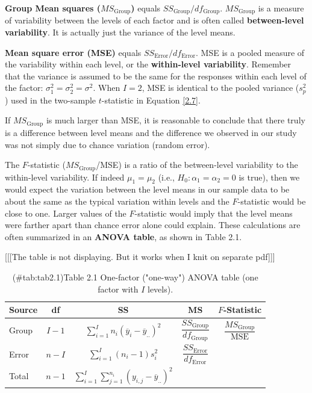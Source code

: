 \documentclass[
]{report}
\begin{document}
\textbf{Group Mean squares (\(MS_{\text{Group}}\))} equals \(SS_{\text{Group}}/df_{\text{Group}}\). \(MS_{\text{Group}}\) is a measure of variability between the levels of each factor and is often called \textbf{between-level variability}. It is actually just the variance of the level means.

\textbf{Mean square error (MSE)} equals \(SS_{\text{Error}}/df_{\text{Error}}\). MSE is a pooled measure of the variability within each level, or the \textbf{within-level variability}. Remember that the variance is assumed to be the same for the responses within each level of the factor: \(\sigma_1^2 = \sigma_2^2 = \sigma^2\). When \(I = 2\), MSE is identical to the pooled variance (\(s_p^2\)) used in the two-sample \(t\)-statistic in Equation \ref{2.7}.

If \(MS_{\text{Group}}\) is much larger than MSE, it is reasonable to conclude that there truly is a difference between level means and the difference we observed in our study was not simply due to chance variation (random error).

The \(F\)-statistic (\(MS_{\text{Group}}\)/MSE) is a ratio of the between-level variability to the within-level variability. If indeed \(\mu_1 = \mu_2\) (i.e., \(H_0\!:\! \alpha_1 = \alpha_2 = 0\) is true), then we would expect the variation between the level means in our sample data to be about the same as the typical variation within levels and the \(F\)-statistic would be close to one. Larger values of the \(F\)-statistic would imply that the level means were farther apart than chance error alone could explain. These calculations are often summarized in an \textbf{ANOVA table}, as shown in Table 2.1.

{[}{[}{[}The table is not displaying. But it works when I knit on separate pdf{]}{]}{]}

\begin{table}[!h]
\centering
\caption{(\#tab:tab2.1)Table 2.1 One-factor ("one-way") ANOVA table (one factor with $I$ levels).}
\centering
\begin{tabular}[t]{lcccc}
\toprule
Source & df & SS & MS & $F$-Statistic\\
\midrule
Group & $I-1$ & $\displaystyle\sum_{i=1}^{I} n_i (\overline{y}_i - \overline{y}_{..})^2$ & $\dfrac{SS_{\text{Group}}}{df_{\text{Group}}}$ & $\dfrac{MS_{\text{Group}}}{\text{MSE}}$\\
Error & $n-I$ & $\displaystyle\sum_{i=1}^{I} (n_i-1)s_i^2$ & $\dfrac{SS_{\text{Error}}}{df_{\text{Error}}}$ & \\
Total & $n-1$ & $\displaystyle\sum_{i=1}^I \sum_{j=1}^{n_i} (y_{i,j} - \overline{y}_{..})^2$ &  & \\
\bottomrule
\end{tabular}
\end{table}
\end{document}
